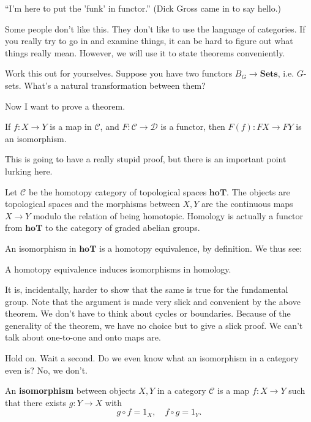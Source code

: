 \begin{remark} 
``I'm here to put the 'funk' in functor.'' (Dick Gross came in to say hello.)
\end{remark} 

Some people don't like this. They don't like to use the language of categories.
If you really try to go in and examine things, it can be hard to figure out
what things really mean.
However, we will use it to state theorems conveniently. 


\begin{exercise} 
Work this out for yourselves. Suppose you have two functors $B_G \to
\mathbf{Sets}$, i.e. $G$-sets. What's a natural transformation between them?
\end{exercise} 

Now I want to prove a theorem.
\begin{theorem} 
If $f: X \to Y$ is a map in $\mathcal{C}$, and $F: \mathcal{C} \to \mathcal{D}$
is a functor, then $F(f): FX \to FY$ is an isomorphism. 
\end{theorem} 
This is going to have a really stupid proof, but there is an important point
lurking here.
\begin{example} 
Let $\mathcal{C}$ be the homotopy category of topological spaces
$\mathbf{hoT}$. The objects are topological spaces and the morphisms between
$X, Y$ are the continuous maps $X \to Y$ modulo the relation of being
homotopic. Homology is actually a functor from $\mathbf{hoT}$ to the category
of graded abelian groups.

An isomorphism in $\mathbf{hoT}$ is a homotopy equivalence, by definition. We
thus see:

\begin{corollary} 
A homotopy equivalence induces isomorphisms in homology.
\end{corollary} 

It is, incidentally, harder to show that the same is true for the fundamental
group. Note that the argument is made very slick and convenient by the above
theorem. We don't have to think about cycles or boundaries. 
Because of the generality of the theorem, we have no choice but to give a slick
proof. We can't talk about one-to-one and onto maps are.
\end{example} 


Hold on. Wait a second. Do we even know what an isomorphism in a category even
is? No, we don't.

\begin{definition} 
An \textbf{isomorphism} between objects $X, Y$ in a category $\mathcal{C}$ is a
map $f: X \to Y$ such that there exists $g: Y \to X$ with 
\[ g \circ f = 1_X, \quad f \circ g = 1_Y.  \]
\end{definition} 

